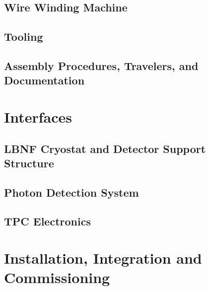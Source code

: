 \subsection{Wire Winding Machine}
\label{sec:fdsp-apa-winding}


\subsection{Tooling}
\label{sec:fdsp-apa-tooling}


\subsection{Assembly Procedures, Travelers, and Documentation}
\label{sec:fdsp-apa-assy}




\section{Interfaces}
\label{sec:fdsp-apa-intfc}



\subsection{LBNF Cryostat and Detector Support Structure}
\label{sec:fdsp-apa-intfc-lbnf-dss}


\subsection{Photon Detection System}
\label{sec:fdsp-apa-intfc-pds}


\subsection{TPC Electronics}
\label{sec:fdsp-apa-intfc-elec}




\section{Installation, Integration and Commissioning}
\label{sec:fdsp-apa-install}


